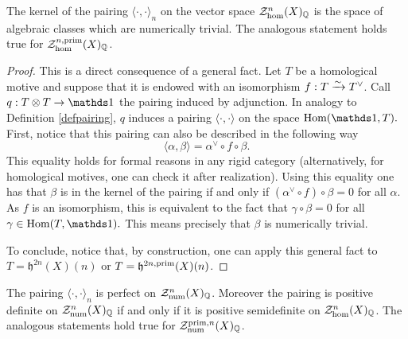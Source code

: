 \begin{prop}
\notready\label{kerpairing}
The kernel of the pairing $\langle \cdot, \cdot \rangle_{n}$  on the vector space $\mathcal{Z}_{\hom}^{n}(X)_{\mathbb{Q}}$ is the space of algebraic classes  which are numerically trivial. The analogous statement holds true for $\mathcal{Z}_{\hom}^{n,\mathrm{prim}}(X)_{\mathbb{Q}}$.
\end{prop}
\begin{proof}

This is a direct consequence of a general fact. Let $T$ be a homological motive and suppose that it is endowed with an isomorphism
$f:T \xrightarrow{\sim } T^\vee$. Call $q: T \otimes T \rightarrow \one $ the pairing induced by adjunction. In analogy to Definition \ref{defpairing}, $q$ induces a pairing $\langle \cdot , \cdot \rangle$ on the space $\Hom(\one, T).$ First, notice that this pairing can also be described in the following way
\[\langle \alpha,\beta\rangle=\alpha^\vee \circ f \circ \beta.\]
This equality holds for formal reasons in any rigid category (alternatively, for homological motives, one can check it after realization).
Using this equality one has that $\beta$ is in the kernel of the pairing if and only if  $(\alpha^\vee \circ f) \circ \beta=0$ for all $\alpha$. As $f$ is an isomorphism, this is equivalent to the fact that $\gamma \circ \beta=0$ for all $\gamma\in\Hom(T,\one).$ This means precisely that $\beta$ is numerically trivial.

To conclude, notice that, by construction, one can apply this general fact to $T= \mathfrak{h}^{2n}(X)(n)$ or $T= \mathfrak{h}^{2n,\mathrm{prim}}(X)(n)$.
\end{proof}
\begin{corollary}
\notready\label{semipos}
The pairing $\langle \cdot, \cdot \rangle_{n}$  is perfect on $\mathcal{Z}_{\mathrm{num}}^{n}(X)_{\mathbb{Q}}$. Moreover the pairing  is positive definite on  $\mathcal{Z}_{\mathrm{num}}^{n}(X)_{\mathbb{Q}}$ if and only if it is positive semidefinite on $\mathcal{Z}_{\hom}^{n}(X)_{\mathbb{Q}}$. The analogous statements hold true for $\mathcal{Z}_{\mathrm{num}}^{\mathrm{prim},n}(X)_{\mathbb{Q}}$.
\end{corollary}
